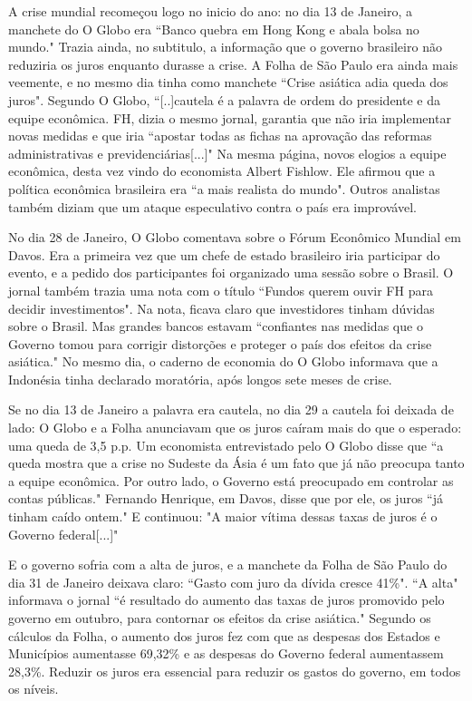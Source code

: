 \documentclass{article}
\begin{document}
A crise mundial recomeçou logo no inicio do ano: no dia 13 de Janeiro, a manchete do O Globo era ``Banco quebra em Hong Kong e abala bolsa no mundo." Trazia ainda, no subtitulo, a informação que o governo brasileiro não reduziria os juros enquanto durasse a crise. A Folha de São Paulo era ainda mais veemente, e no mesmo dia tinha como manchete ``Crise asiática adia queda dos juros". Segundo O Globo, ``[..]cautela é a palavra de ordem do presidente e da equipe econômica. FH, dizia o mesmo jornal, garantia que não iria implementar novas medidas e que iria ``apostar todas as fichas na aprovação das reformas administrativas e previdenciárias[...]" Na mesma página, novos elogios a equipe econômica, desta vez vindo do economista Albert Fishlow. Ele afirmou que a política econômica brasileira era ``a mais realista do mundo". Outros analistas também diziam que um ataque especulativo contra o país era improvável.     

No dia 28 de Janeiro, O Globo comentava sobre o Fórum Econômico Mundial em Davos. Era a primeira vez que um chefe de estado brasileiro iria participar do evento, e a pedido dos participantes foi organizado uma sessão sobre o Brasil. O jornal também trazia uma nota com o título ``Fundos querem ouvir FH para decidir investimentos". Na nota, ficava claro que investidores tinham dúvidas sobre o Brasil. Mas grandes bancos estavam ``confiantes nas medidas que o Governo tomou para corrigir distorções e proteger o país dos efeitos da crise asiática." No mesmo dia, o caderno de economia do O Globo informava que a Indonésia tinha declarado moratória, após longos sete meses de crise. 

Se no dia 13 de Janeiro a palavra era cautela, no dia 29 a cautela foi deixada de lado: O Globo e a Folha anunciavam que os juros caíram mais do que o esperado: uma queda de 3,5 p.p. Um economista entrevistado pelo O Globo disse que ``a queda mostra que a crise no Sudeste da Ásia é um fato que já não preocupa tanto a equipe econômica. Por outro lado, o Governo está preocupado em controlar as contas públicas." Fernando Henrique, em Davos, disse que por ele, os juros ``já tinham caído ontem." E continuou: "A maior vítima dessas taxas de juros é o Governo federal[...]"

E o governo sofria com a alta de juros, e a manchete da Folha de São Paulo do dia 31 de Janeiro deixava claro: ``Gasto com juro da dívida cresce 41\%". ``A alta" informava o jornal ``é resultado do aumento das taxas de juros promovido pelo governo em outubro, para contornar os efeitos da crise asiática." Segundo os cálculos da Folha, o aumento dos juros fez com que as despesas dos Estados e Municípios aumentasse 69,32\% e as despesas do Governo federal aumentassem 28,3\%. Reduzir os juros era essencial para reduzir os gastos do governo, em todos os níveis.
\end{document}
